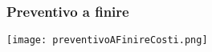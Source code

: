 \begin{frame}
  \frametitle{Preventivo a finire}
  \texttt{[image: preventivoAFinireCosti.png]}
\end{frame}
